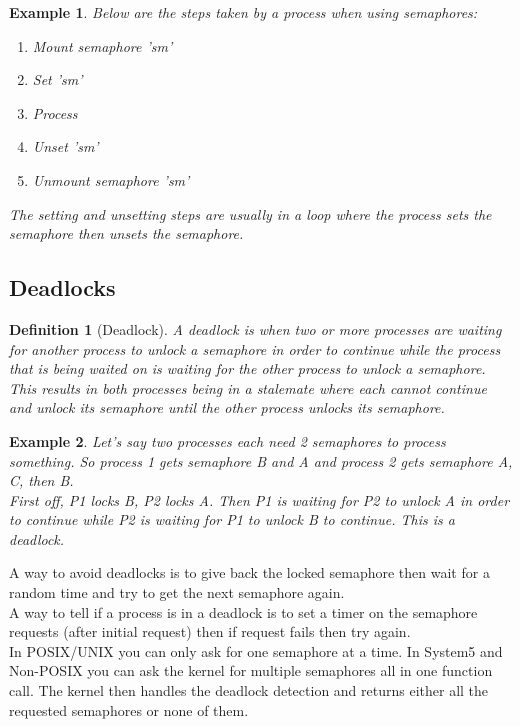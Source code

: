 \documentclass{report}
\newtheorem*{ex}{Example}
\newtheorem*{defn}{Definition}
\begin{document}
\begin{ex}
Below are the steps taken by a process when using semaphores:
\begin{enumerate}
\item Mount semaphore 'sm'
\item Set 'sm'
\item Process
\item Unset 'sm'
\item Unmount semaphore 'sm'
\end{enumerate}
The setting and unsetting steps are usually in a loop where the process sets the semaphore then unsets the semaphore.
\end{ex}

\subsection{Deadlocks}
\begin{defn}[Deadlock]
A deadlock is when two or more processes are waiting for another process to unlock a semaphore in order to continue while the process that is being waited on is waiting for the other process to unlock a semaphore. This results in both processes being in a stalemate where each cannot continue and unlock its semaphore until the other process unlocks its semaphore.
\end{defn}
\begin{ex}
Let's say two processes each need 2 semaphores to process something. So process 1 gets semaphore B and A and process 2 gets semaphore A, C, then B.\\
First off, P1 locks B, P2 locks A. Then P1 is waiting for P2 to unlock A in order to continue while P2 is waiting for P1 to unlock B to continue. This is a deadlock.
\end{ex}

A way to avoid deadlocks is to give back the locked semaphore then wait for a random time and try to get the next semaphore again.\\

A way to tell if a process is in a deadlock is to set a timer on the semaphore requests (after initial request) then if request fails then try again.\\

In POSIX/UNIX you can only ask for one semaphore at a time. In System5 and Non-POSIX you can ask the kernel for multiple semaphores all in one function call. The kernel then handles the deadlock detection and returns either all the requested semaphores or none of them.
\end{document}
